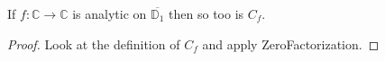 \begin{lemma}[CfAnalytic]
\label{CfAnalytic}
\leanok
If $f:\mathbb{C}\to\mathbb{C}$ is analytic on $\overline{\mathbb{D}_1}$ then so too is $C_f$.
\end{lemma}
\begin{proof}
\leanok
Look at the definition of $C_f$ and apply ZeroFactorization.
\end{proof}
